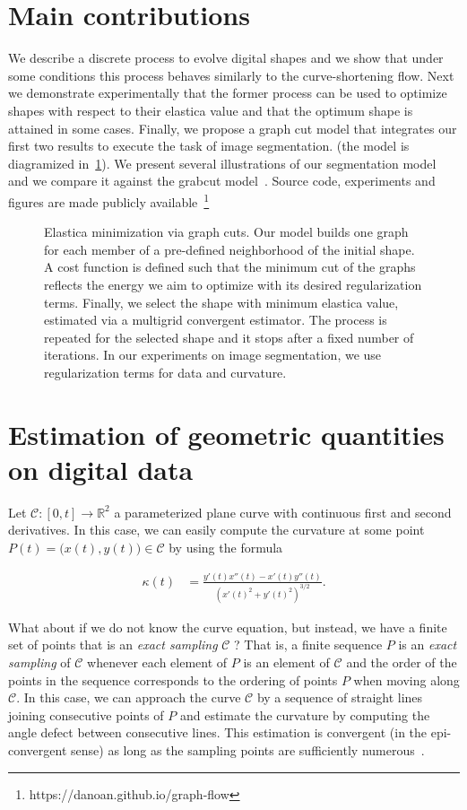 \documentclass{siamart220329}
\newcommand{\C}{\mathcal{C}} %
\begin{document}
\section{Main contributions}
We describe a discrete process to evolve digital shapes and we show that under
some conditions this process behaves similarly to the curve-shortening flow.
Next we demonstrate experimentally that the former process can be used to
optimize shapes with respect to their elastica value and that the optimum shape
is attained in some cases. Finally, we propose a graph cut model that integrates
our first two results to execute the task of image segmentation. (the model is
diagramized in~\cref{fig:model-overview}). We present several illustrations of
our segmentation model and we compare it against the grabcut
model~\cite{rother04grabcut}. Source code, experiments and figures are made
publicly available~\footnote{https://danoan.github.io/graph-flow}
%
%
\begin{figure}
\center

\caption{Elastica minimization via graph cuts. Our model
builds one graph for each member of a pre-defined neighborhood of the
initial shape. A cost function is defined such that the minimum cut of the 
graphs reflects the energy we aim to optimize with its desired regularization 
terms. Finally, we select the shape with minimum elastica value, estimated 
via a multigrid convergent estimator. The process is repeated for the selected 
shape and it stops after a fixed number of iterations. In our experiments 
on image segmentation, we use regularization terms for data and curvature.}
\label{fig:model-overview}
\end{figure}
%
%
%
%
%
\section{Estimation of geometric quantities on digital data}

Let $\C:[0,t] \rightarrow \mathbb{R}^2$ a parameterized plane curve with
continuous first and second derivatives. In this case, we can easily compute the
curvature at some point $P(t) = \big( x(t),y(t) \big) \in \C$ by using the
formula

\begin{align*}
  \kappa (t) &= \frac{y'(t)x''(t) -x'(t)y''(t)}{(x'(t)^2 + y'(t)^2)^{3/2}}.
\end{align*}

What about if we do not know the curve equation, but instead, we have a finite
set of points that is an \emph{exact sampling} $\C$ ? That is, a finite sequence
$P$ is an {\em exact sampling} of $\C$ whenever each element of $P$ is an element
of $\C$ and the order of the points in the sequence corresponds to the ordering
of points $P$ when moving along $\C$. In this case, we can approach the curve $\C$
by a sequence of straight lines joining consecutive points of $P$ and estimate
the curvature by computing the angle defect between consecutive lines. This
estimation is convergent (in the epi-convergent sense) as long as the sampling
points are sufficiently
numerous~\cite{bruckstein01discrete,bruckstein01convergence}.
\end{document}
